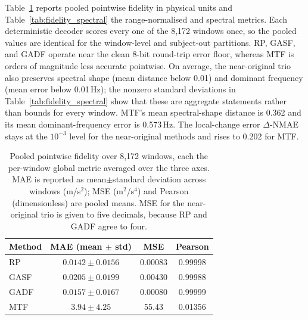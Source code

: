 \documentclass[5p]{elsarticle}
\begin{document}
Table~\ref{tab:pointwise_pooled} reports pooled pointwise fidelity in physical units and Table~\ref{tab:fidelity_spectral} the range-normalised and spectral metrics. Each deterministic decoder scores every one of the 8,172 windows once, so the pooled values are identical for the window-level and subject-out partitions. RP, GASF, and GADF operate near the clean 8-bit round-trip error floor, whereas MTF is orders of magnitude less accurate pointwise. On average, the near-original trio also preserves spectral shape (mean distance below 0.01) and dominant frequency (mean error below 0.01\,Hz); the nonzero standard deviations in Table~\ref{tab:fidelity_spectral} show that these are aggregate statements rather than bounds for every window. MTF's mean spectral-shape distance is 0.362 and its mean dominant-frequency error is 0.573\,Hz. The local-change error \(\Delta\)-NMAE stays at the \(10^{-3}\) level for the near-original methods and rises to 0.202 for MTF.

\begin{table}[!htbp]
\centering
\caption{Pooled pointwise fidelity over 8,172 windows, each the per-window global metric averaged over the three axes. MAE is reported as mean$\pm$standard deviation across windows (m/s\(^2\)); MSE (m\(^2\)/s\(^4\)) and Pearson (dimensionless) are pooled means. MSE for the near-original trio is given to five decimals, because RP and GADF agree to four.}\label{tab:pointwise_pooled}
\begin{tabular}{lccc}
\toprule
Method & MAE (mean \(\pm\) std) & MSE & Pearson \\
\midrule
RP   & \(0.0142\pm0.0156\) & 0.00083 & 0.99998 \\
GASF & \(0.0205\pm0.0199\) & 0.00430 & 0.99988 \\
GADF & \(0.0157\pm0.0167\) & 0.00080 & 0.99999 \\
MTF  & \(3.94\pm4.25\)     & 55.43   & 0.01356 \\
\bottomrule
\end{tabular}
\end{table}
\end{document}
